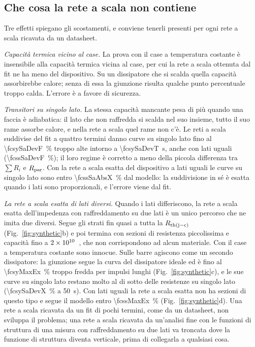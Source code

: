 \documentclass[10pt,a4paper]{scrartcl}
\let\newcommand\fcitdefine
\newcommand{\Rjc}{R_\mathrm{th(j-c)}}
\newcommand{\Rpar}{R_\mathrm{par}}
\newcommand{\JK}{\si{\joule\per\kelvin}}
\begin{document}
\subsection{Che cosa la rete a scala non contiene}
\label{sec:missing}
Tre effetti spiegano gli scostamenti, e conviene tenerli presenti per ogni rete a scala ricavata da un datasheet.

\emph{Capacità termica vicino al case.} La prova con il case a temperatura costante è insensibile alla capacità termica vicina al case, per cui la rete a scala ottenuta dal fit ne ha meno del dispositivo. Su un dissipatore che si scalda quella capacità assorbirebbe calore; senza di essa la giunzione risulta qualche punto percentuale troppo calda. L'errore è a favore di sicurezza.

\emph{Transitori su singolo lato.} La stessa capacità mancante pesa di più quando una faccia è adiabatica: il lato che non raffredda si scalda nel suo insieme, tutto il suo rame assorbe calore, e nella rete a scala quel rame non c'è. Le reti a scala suddivise del fit a quattro termini danno curve su singolo lato fino al \SI{\fcsySaDevF}{\percent} troppo alte intorno a \SI{\fcsySaDevT}{\second}, anche con lati uguali (\SI{\fcssSaDevF}{\percent}); il loro regime è corretto a meno della piccola differenza tra $\sum R_i$ e $\Rpar$. Con la rete a scala esatta del dispositivo a lati uguali le curve su singolo lato sono entro \SI{\fcssSaAbsX}{\percent} dal modello: la suddivisione in sé è esatta quando i lati sono proporzionali, e l'errore viene dal fit.

\emph{La rete a scala esatta di lati diversi.} Quando i lati differiscono, la rete a scala esatta dell'impedenza con raffreddamento su due lati è un unico percorso che ne imita due diversi. Segue gli strati fin quasi a tutta la $\Rjc$ (Fig.~\ref{fig:synthetic}b) e poi termina con sezioni di resistenza piccolissima e capacità fino a $2\times 10^{10}$~\JK, che non corrispondono ad alcun materiale. Con il case a temperatura costante sono innocue. Sulle barre agiscono come un secondo dissipatore: la giunzione segue la curva del dissipatore ideale ed è fino al \SI{\fcsyMaxEx}{\percent} troppo fredda per impulsi lunghi (Fig.~\ref{fig:synthetic}c), e le sue curve su singolo lato restano molto al di sotto delle resistenze su singolo lato (\SI{\fcsySaDevX}{\percent} a \SI{50}{\second}). Con lati uguali la rete a scala esatta non ha sezioni di questo tipo e segue il modello entro \SI{\fcssMaxEx}{\percent} (Fig.~\ref{fig:synthetic}d). Una rete a scala ricavata da un fit di pochi termini, come da un datasheet, non sviluppa il problema; una rete a scala ricavata da un'analisi fine con le funzioni di struttura di una misura con raffreddamento su due lati va troncata dove la funzione di struttura diventa verticale, prima di collegarla a qualsiasi cosa.
\end{document}
